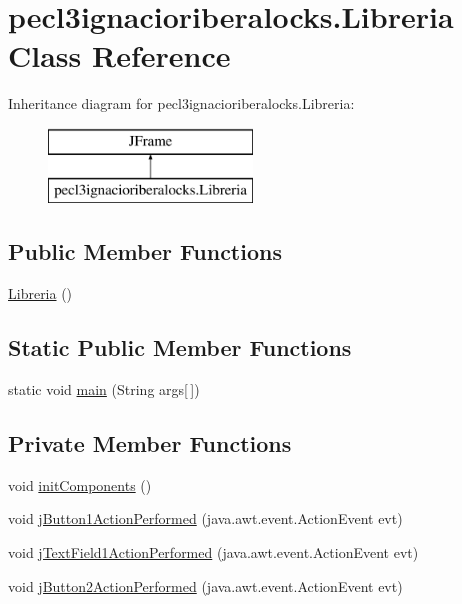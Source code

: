\hypertarget{classpecl3ignacioriberalocks_1_1_libreria}{}\section{pecl3ignacioriberalocks.\+Libreria Class Reference}
\label{classpecl3ignacioriberalocks_1_1_libreria}
Inheritance diagram for pecl3ignacioriberalocks.\+Libreria\+:\begin{figure}[H]
\begin{center}
\leavevmode
\includegraphics[height=2.000000cm]{classpecl3ignacioriberalocks_1_1_libreria}
\end{center}
\end{figure}
\subsection*{Public Member Functions}
\begin{DoxyCompactItemize}
\item 
\mbox{\hyperlink{classpecl3ignacioriberalocks_1_1_libreria_ade479befa1d595d3476eecaf77ef6330}{Libreria}} ()
\end{DoxyCompactItemize}
\subsection*{Static Public Member Functions}
\begin{DoxyCompactItemize}
\item 
static void \mbox{\hyperlink{classpecl3ignacioriberalocks_1_1_libreria_a8fd9ca2a46f817d6a1520ed4dc25b678}{main}} (String args\mbox{[}$\,$\mbox{]})
\end{DoxyCompactItemize}
\subsection*{Private Member Functions}
\begin{DoxyCompactItemize}
\item 
void \mbox{\hyperlink{classpecl3ignacioriberalocks_1_1_libreria_a5f8b20ced6b6e640b45ca0df0b12321d}{init\+Components}} ()
\item 
void \mbox{\hyperlink{classpecl3ignacioriberalocks_1_1_libreria_a98cfec24b354efc41b40f054caaf0801}{j\+Button1\+Action\+Performed}} (java.\+awt.\+event.\+Action\+Event evt)
\item 
void \mbox{\hyperlink{classpecl3ignacioriberalocks_1_1_libreria_af0194299f3a370c2e5840e7f6501d61e}{j\+Text\+Field1\+Action\+Performed}} (java.\+awt.\+event.\+Action\+Event evt)
\item 
void \mbox{\hyperlink{classpecl3ignacioriberalocks_1_1_libreria_a79ca87e22a62e0239faaa922c318ec2d}{j\+Button2\+Action\+Performed}} (java.\+awt.\+event.\+Action\+Event evt)
\end{DoxyCompactItemize}
